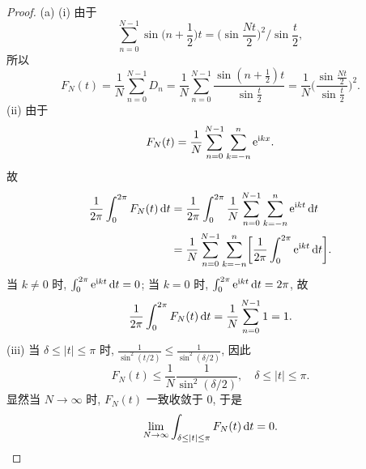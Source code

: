 \begin{proof}
  (a) (i) 由于
  \[\sum_{n=0}^{N-1} \sin \biggl(n+\frac{1}{2}\biggr)t 
    = \biggl(\sin\frac{Nt}{2}\biggr)^2 \bigg/ \sin\frac{t}{2},\]
  所以
  \[F_N(t) = \frac{1}{N} \sum_{n=0}^{N-1} D_n
    = \frac{1}{N} \sum_{n=0}^{N-1} \frac{\sin (n+\frac{1}{2})t}{\sin\frac{t}{2}}
    = \frac{1}{N} \biggl(\frac{\sin\frac{Nt}{2}}{\sin\frac{t}{2}}\biggr)^2.\]
  (ii) 由于
  \[F_N(t) = \frac{1}{N} \sum_{n=0}^{N-1} \sum_{k=-n}^n \mathrm{e}^{\mathrm{i} kx}.\]
  故
  \begin{align*}
    \frac{1}{2\pi} \int_0^{2\pi} F_N(t) \mathop{}\!\mathrm{d} t
    & = \frac{1}{2\pi} \int_0^{2\pi} \frac{1}{N} \sum_{n=0}^{N-1}\sum_{k=-n}^n
        \mathrm{e}^{\mathrm{i} kt} \mathop{}\!\mathrm{d} t \\
    & = \frac{1}{N} \sum_{n=0}^{N-1}\sum_{k=-n}^n 
        \biggl[\frac{1}{2\pi} \int_0^{2\pi} \mathrm{e}^{\mathrm{i} kt} \mathop{}\!\mathrm{d} t\biggr].
  \end{align*}
  当 $k\neq 0$ 时, $\int_0^{2\pi} \mathrm{e}^{\mathrm{i} kt} \mathop{}\!\mathrm{d} t = 0$;
  当 $k = 0$ 时, $\int_0^{2\pi} \mathrm{e}^{\mathrm{i} kt} \mathop{}\!\mathrm{d} t = 2\pi$, 故
  \[\frac{1}{2\pi} \int_0^{2\pi} F_N(t) \mathop{}\!\mathrm{d} t
    = \frac{1}{N} \sum_{n=0}^{N-1} 1 = 1.\]
  (iii) 当 $\delta\leq |t| \leq\pi$ 时, $\frac{1}{\sin^2(t/2)} \leq \frac{1}{\sin^2(\delta/2)}$,
  因此
  \[F_N(t) \leq \frac{1}{N} \frac{1}{\sin^2(\delta/2)},\quad \delta\leq |t|\leq \pi.\]
  显然当 $N\to\infty$ 时, $F_N(t)$ 一致收敛于 $0$, 于是
  \[\lim_{N\to\infty} \int_{\delta\leq |t|\leq \pi} F_N(t) \mathop{}\!\mathrm{d} t = 0.\]
\end{proof}